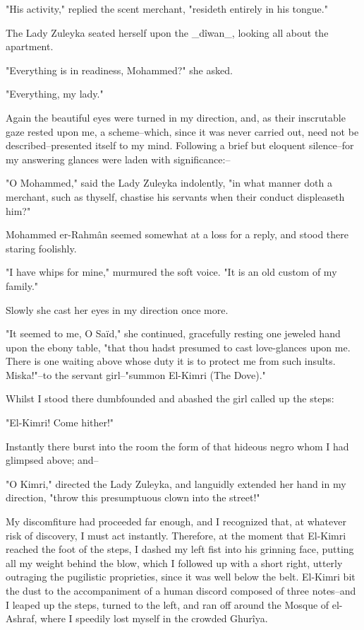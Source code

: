 "His activity," replied the scent merchant, "resideth entirely in
his tongue."

The Lady Zuleyka seated herself upon the _dîwan_, looking all about
the apartment.

"Everything is in readiness, Mohammed?" she asked.

"Everything, my lady."

Again the beautiful eyes were turned in my direction, and, as their
inscrutable gaze rested upon me, a scheme--which, since it was never
carried out, need not be described--presented itself to my mind.
Following a brief but eloquent silence--for my answering glances were
laden with significance:--

"O Mohammed," said the Lady Zuleyka indolently, "in what manner doth
a merchant, such as thyself, chastise his servants when their conduct
displeaseth him?"

Mohammed er-Rahmân seemed somewhat at a loss for a reply, and stood
there staring foolishly.

"I have whips for mine," murmured the soft voice. "It is an old custom
of my family."

Slowly she cast her eyes in my direction once more.

"It seemed to me, O Saïd," she continued, gracefully resting one
jeweled hand upon the ebony table, "that thou hadst presumed to cast
love-glances upon me. There is one waiting above whose duty it is to
protect me from such insults. Miska!"--to the servant girl--"summon
El-Kimri (The Dove)."

Whilst I stood there dumbfounded and abashed the girl called up the
steps:

"El-Kimri! Come hither!"

Instantly there burst into the room the form of that hideous negro
whom I had glimpsed above; and--

"O Kimri," directed the Lady Zuleyka, and languidly extended her hand
in my direction, "throw this presumptuous clown into the street!"

My discomfiture had proceeded far enough, and I recognized that, at
whatever risk of discovery, I must act instantly. Therefore, at the
moment that El-Kimri reached the foot of the steps, I dashed my left
fist into his grinning face, putting all my weight behind the blow,
which I followed up with a short right, utterly outraging the
pugilistic proprieties, since it was well below the belt. El-Kimri bit
the dust to the accompaniment of a human discord composed of three
notes--and I leaped up the steps, turned to the left, and ran off
around the Mosque of el-Ashraf, where I speedily lost myself in the
crowded Ghurîya.

